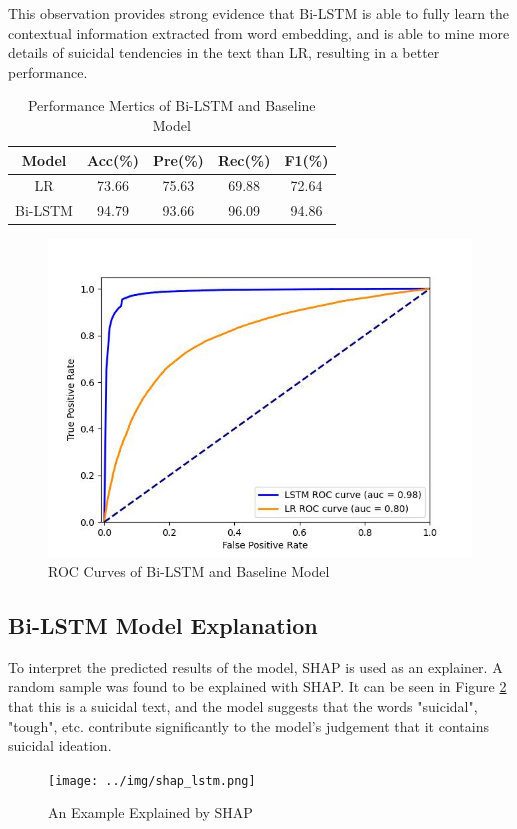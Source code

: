 \documentclass[ %
                    author={Bocheng Wang},
                supervisor={Dr. Qiang Liu},
                    degree={MSc},
                     title={A Research on Identification of Suicide Ideation in Texts with Multiple Models},
                      type={},
                      year={2024}]{dissertation}
\begin{document}
This observation provides strong evidence that Bi-LSTM is able to fully learn the contextual information extracted from word embedding, and is able to mine more details of suicidal tendencies in the text than LR, resulting in a better performance.

\begin{table}[!h]
      \centering
      \begin{tabular}{c|cccc}
            \hline
            Model & Acc(\%) & Pre(\%) & Rec(\%) & F1(\%) \\
            \hline
            LR      & 73.66 & 75.63 & 69.88 & 72.64 \\
            Bi-LSTM & 94.79 & 93.66 & 96.09 & 94.86 \\
            \hline
      \end{tabular}
      \caption{Performance Mertics of Bi-LSTM and Baseline Model}
      \label{tab:lstmmetrics}
\end{table}

\begin{figure}[h]
      \centering
      \includegraphics[width=0.45\linewidth]{../img/roc_LRb&LSTM.jpg}
      \caption{ROC Curves of Bi-LSTM and Baseline Model}
      \label{fig:rocLRLSTM}
\end{figure}

\subsection{Bi-LSTM Model Explanation}
\noindent
To interpret the predicted results of the model, SHAP is used as an explainer. A random sample was found to be explained with SHAP. It can be seen in Figure \ref{shap_lstm} that this is a suicidal text, and the model suggests that the words "suicidal", "tough", etc. contribute significantly to the model's judgement that it contains suicidal ideation.

\begin{figure}[h]
      \centering
      \texttt{[image: ../img/shap\_lstm.png]}
      \caption{An Example Explained by SHAP}
      \label{shap_lstm}
\end{figure}
\end{document}
